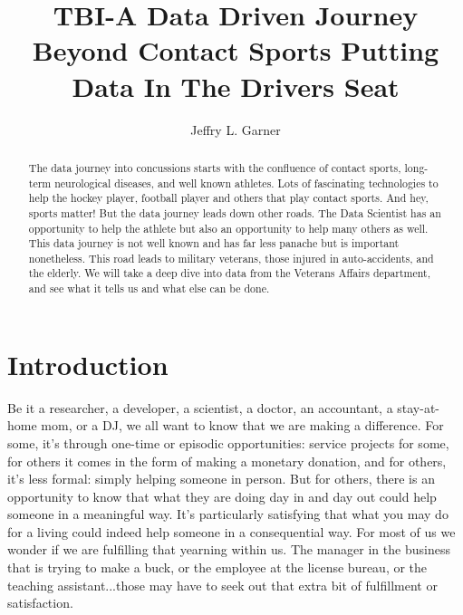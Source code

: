 \documentclass[sigconf]{acmart}
\begin{document}
\title{TBI-A Data Driven Journey Beyond Contact Sports 
Putting Data In The Drivers Seat}



\author{Jeffry L. Garner}

\begin{abstract}

The data journey into concussions starts with the confluence of contact sports, long-term neurological diseases, and well known athletes.  Lots of fascinating technologies to help the hockey player, football player and others that play contact sports.  And hey, sports matter!  But the data journey leads down other roads.  The Data Scientist has an opportunity to help the athlete but also an opportunity to help many others as well.  This data journey is not well known and has far less panache but is important nonetheless.  This road leads to military veterans, those injured in auto-accidents, and the elderly.  We will take a deep dive into data from the Veterans Affairs department, and see what it tells us and what else can be done. 

\end{abstract}



\maketitle

\section{Introduction}

Be it a researcher, a developer, a scientist, a doctor, an accountant, a stay-at-home mom, or a DJ, we all want to know that we are making a difference.  For some, it's through one-time or episodic opportunities: service projects for some, for others it comes in the form of making a monetary donation, and for others, it's less formal: simply helping someone in person.  But for others, there is an opportunity to know that what they are doing day in and day out could help someone in a meaningful way.  It's particularly satisfying that what you may do for a living could indeed help someone in a consequential way.   For most of us we wonder if we are fulfilling that yearning within us.  The manager in the business that is trying to make a buck, or the employee at the license bureau, or the teaching assistant...those may have to seek out that extra bit of fulfillment or satisfaction.
\end{document}
